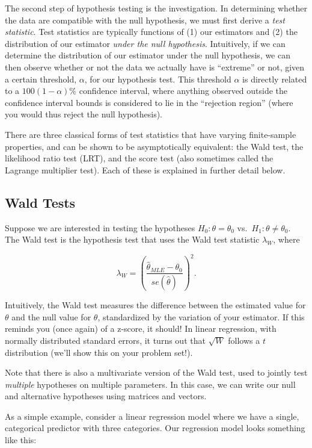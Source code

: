 \documentclass[
  letterpaper,
  DIV=11,
  numbers=noendperiod]{scrreprt}
\begin{document}
The second step of hypothesis testing is the investigation. In
determining whether the data are compatible with the null hypothesis, we
must first derive a \emph{test statistic}. Test statistics are typically
functions of (1) our estimators and (2) the distribution of our
estimator \emph{under the null hypothesis}. Intuitively, if we can
determine the distribution of our estimator under the null hypothesis,
we can then observe whether or not the data we actually have is
``extreme'' or not, given a certain threshold, \(\alpha\), for our
hypothesis test. This threshold \(\alpha\) is directly related to a
\(100(1 - \alpha)\%\) confidence interval, where anything observed
outside the confidence interval bounds is considered to lie in the
``rejection region'' (where you would thus reject the null hypothesis).

There are three classical forms of test statistics that have varying
finite-sample properties, and can be shown to be asymptotically
equivalent: the Wald test, the likelihood ratio test (LRT), and the
score test (also sometimes called the Lagrange multiplier test). Each of
these is explained in further detail below.

\hypertarget{wald-tests}{%
\subsection*{Wald Tests}\label{wald-tests}}

Suppose we are interested in testing the hypotheses
\(H_0: \theta = \theta_0\) vs.~\(H_1: \theta \neq \theta_0\). The Wald
test is the hypothesis test that uses the Wald test statistic
\(\lambda_{W}\), where

\[
\lambda_W = \left( \frac{\hat{\theta}_{MLE} - \theta_0}{se(\hat{\theta})}\right)^2.
\]

Intuitively, the Wald test measures the difference between the estimated
value for \(\theta\) and the null value for \(\theta\), standardized by
the variation of your estimator. If this reminds you (once again) of a
z-score, it should! In linear regression, with normally distributed
standard errors, it turns out that \(\sqrt{W}\) follows a \(t\)
distribution (we'll show this on your problem set!).

Note that there is also a multivariate version of the Wald test, used to
jointly test \emph{multiple} hypotheses on multiple parameters. In this
case, we can write our null and alternative hypotheses using matrices
and vectors.

As a simple example, consider a linear regression model where we have a
single, categorical predictor with three categories. Our regression
model looks something like this:
\end{document}
